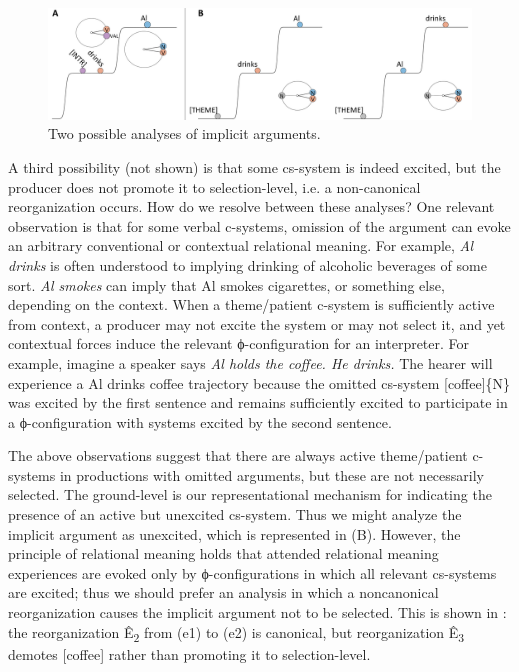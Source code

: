   
\begin{figure}
\includegraphics[width=\textwidth]{figures/Tilsen-img86.png}
\caption{Two possible analyses of implicit arguments.}
\label{fig:4:36}
\end{figure}
 

  A third possibility (not shown) is that some cs-system is indeed excited, but the producer does not promote it to selection-level, i.e. a non-canonical reorganization occurs. How do we resolve between these analyses? One relevant observation is that for some verbal c-systems, omission of the argument can evoke an arbitrary conventional or contextual relational meaning. For example, \textit{Al drinks} is often understood to implying drinking of alcoholic beverages of some sort. \textit{Al smokes} can imply that Al smokes cigarettes, or something else, depending on the context. When a theme/patient c-system is sufficiently active from context, a producer may not excite the system or may not select it, and yet contextual forces induce the relevant ϕ-configuration for an interpreter. For example, imagine a speaker says \textit{Al holds the coffee. He drinks.} The hearer will experience a {\textbar}Al drinks coffee{\textbar} trajectory because the omitted cs-system [coffee]\{N\} was excited by the first sentence and remains sufficiently excited to participate in a ϕ-configuration with systems excited by the second sentence.

  The above observations suggest that there are always active theme/patient c-systems in productions with omitted arguments, but these are not necessarily selected. The ground-level is our representational mechanism for indicating the presence of an active but unexcited cs-system. Thus we might analyze the implicit argument as unexcited, which is represented in {}(B). However, the principle of relational meaning holds that attended relational meaning experiences are evoked only by ϕ-configurations in which all relevant cs-systems are excited; thus we should prefer an analysis in which a noncanonical reorganization causes the implicit argument not to be selected. This is shown in {}: the reorganization Ê\textsubscript{2} from (e1) to (e2) is canonical, but reorganization Ê\textsubscript{3} demotes [coffee] rather than promoting it to selection-level.

